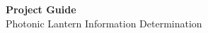 \begin{titlepage}
    \begin{center}
    {\fontsize{40}{48}\selectfont \bfseries Project Guide}
    \\\vspace{20pt}
    {\LARGE Photonic Lantern Information Determination} \\
    \vspace{20pt}
    \textbf{}
    \vspace{8pt}
    \end{center}
    
\end{titlepage}